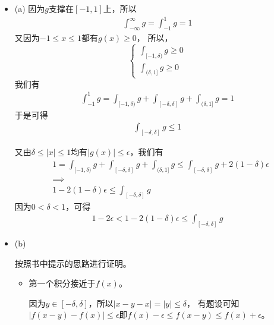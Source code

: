 \documentclass{article}
\begin{document}
\begin{itemize}
  \item (a)
        因为$g$支撑在$[-1, 1]$上，所以
        \begin{align*}
          \int_{-\infty}^{\infty} g = \int_{-1}^{1} g = 1
        \end{align*}
        又因为$-1 \leq x \leq 1$都有$g(x) \geq 0$，
        所以，
        \begin{equation*}
          \begin{cases*}
            \int_{[-1, \delta)} g \geq 0 \\
            \int_{(\delta, 1]} g \geq 0
          \end{cases*}
        \end{equation*}
        我们有
        \begin{align*}
          \int_{-1}^{1} g = \int_{[-1, \delta)} g + \int_{[-\delta, \delta]} g + \int_{(\delta, 1]} g = 1
        \end{align*}
        于是可得
        \begin{align*}
          \int_{[-\delta, \delta]} g \leq 1
        \end{align*}

        又由$\delta \leq |x| \leq 1$均有$|g(x)| \leq \epsilon$，我们有
        \begin{align*}
           & 1 = \int_{[-1, \delta)} g + \int_{[-\delta, \delta]} g + \int_{(\delta, 1]} g \leq \int_{[-\delta, \delta]} g + 2(1 - \delta)\epsilon \\
           & \implies                                                                                                                              \\
           & 1 - 2(1 - \delta) \epsilon \leq \int_{[-\delta, \delta]} g
        \end{align*}
        因为$0 < \delta < 1$，可得
        \begin{align*}
          1 - 2\epsilon < 1 - 2(1 - \delta) \epsilon \leq \int_{[-\delta, \delta]} g
        \end{align*}

  \item (b)

        按照书中提示的思路进行证明。

        \begin{itemize}
          \item 第一个积分接近于$f(x)$。

                因为$y \in [-\delta, \delta]$，所以$|x - y - x| = |y| \leq \delta$，
                有题设可知$|f(x - y) - f(x)| \leq \epsilon$即$f(x) - \epsilon \leq f(x-y) \leq f(x) + \epsilon$。


\end{itemize}
\end{itemize}
\end{document}
